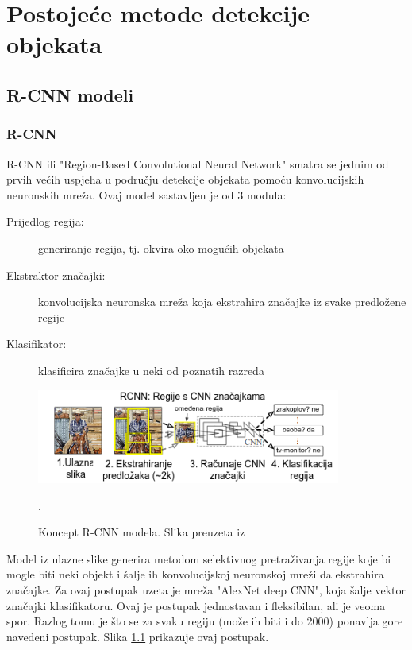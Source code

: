 \chapter{Postojeće metode detekcije objekata}


\section{R-CNN modeli}
\subsection{R-CNN} 
R-CNN ili "Region-Based Convolutional Neural Network" smatra se jednim od prvih većih
uspjeha u području detekcije objekata pomoću konvolucijskih neuronskih mreža. \citep{bworld}\newline
Ovaj model sastavljen je od 3 modula: 
\begin{description}
    \item [Prijedlog regija:]generiranje regija, tj. okvira oko mogućih objekata
    \item [Ekstraktor značajki:]konvolucijska neuronska mreža koja ekstrahira značajke iz svake predložene regije
    \item [Klasifikator:]klasificira značajke u neki od poznatih razreda
\end{description}


\begin{figure}[b]
    \centering
    \includegraphics[width=10cm]{img/R-CNN.png}
    \caption{Koncept R-CNN modela. Slika preuzeta iz \citep{DBLP:journals/corr/GirshickDDM13}}.
    \label{fig:Koncept R-CNN modela}
\end{figure}

Model iz ulazne slike generira metodom selektivnog pretraživanja  regije koje bi mogle biti neki objekt
i šalje ih konvolucijskoj neuronskoj mreži da ekstrahira značajke. Za ovaj postupak uzeta je mreža "AlexNet deep CNN", koja 
šalje vektor značajki klasifikatoru.
Ovaj je postupak jednostavan i fleksibilan, ali je veoma spor. Razlog tomu je što se za svaku regiju (može ih biti i do 2000)
ponavlja gore navedeni postupak. \citep{DBLP:journals/corr/GirshickDDM13} \newline Slika \ref{fig:Koncept R-CNN modela} prikazuje ovaj postupak.
    


